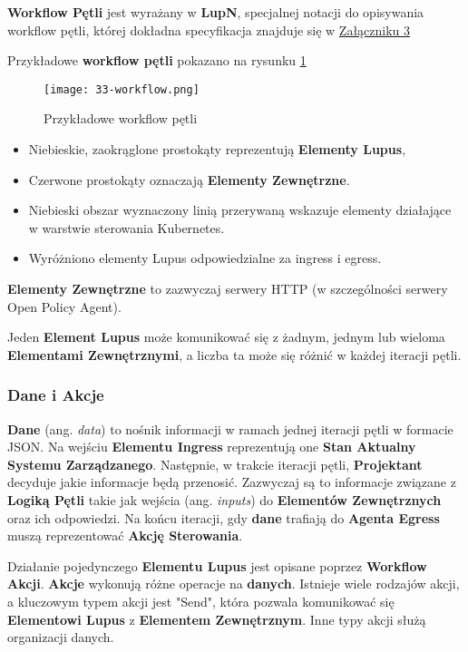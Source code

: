 \textbf{Workflow Pętli} jest wyrażany w \textbf{LupN}, specjalnej notacji do opisywania workflow pętli, której dokładna specyfikacja znajduje się w \hyperref[appendix:3]{Załączniku 3}

Przykładowe \textbf{workflow pętli} pokazano na rysunku \ref{fig:33-workflow}

\begin{figure}[!h]
    \centering \texttt{[image: 33-workflow.png]}
    \caption{Przykładowe workflow pętli}\label{fig:33-workflow}
\end{figure}

\begin{itemize}
    \item Niebieskie, zaokrąglone prostokąty reprezentują \textbf{Elementy Lupus},
    \item Czerwone prostokąty oznaczają \textbf{Elementy Zewnętrzne}.
    \item Niebieski obszar wyznaczony linią przerywaną wskazuje elementy działające w warstwie sterowania Kubernetes. 
    \item Wyróżniono elementy Lupus odpowiedzialne za ingress i egress.
\end{itemize}

\textbf{Elementy Zewnętrzne} to zazwyczaj serwery HTTP (w szczególności serwery Open Policy Agent).

Jeden \textbf{Element Lupus} może komunikować się z żadnym, jednym lub wieloma \textbf{Elementami Zewnętrznymi}, a liczba ta może się różnić w każdej iteracji pętli.

\subsubsection{Dane i Akcje}

\textbf{Dane} (ang. \textit{data}) to nośnik informacji w ramach jednej iteracji pętli w formacie JSON. Na wejściu \textbf{Elementu Ingress} reprezentują one \textbf{Stan Aktualny} \textbf{Systemu Zarządzanego}. Następnie, w trakcie iteracji pętli, \textbf{Projektant} decyduje jakie informacje będą przenosić. Zazwyczaj są to informacje związane z \textbf{Logiką Pętli} takie jak wejścia (ang. \textit{inputs}) do \textbf{Elementów Zewnętrznych} oraz ich odpowiedzi. Na końcu iteracji, gdy \textbf{dane} trafiają do \textbf{Agenta Egress} muszą reprezentować \textbf{Akcję Sterowania}. 

Działanie pojedynczego \textbf{Elementu Lupus} jest opisane poprzez \textbf{Workflow Akcji}. \textbf{Akcje} wykonują różne operacje na \textbf{danych}. Istnieje wiele rodzajów akcji, a kluczowym typem akcji jest "Send", która pozwala komunikować się \textbf{Elementowi Lupus} z \textbf{Elementem Zewnętrznym}. Inne typy akcji służą organizacji danych.

